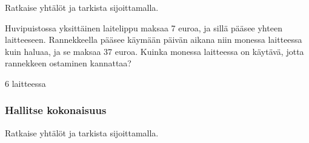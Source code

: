 \begin{tehtavasivu}
\begin{tehtava}
Ratkaise yhtälöt ja tarkista sijoittamalla.
\begin{alakohdat}
\end{alakohdat}
%
\begin{vastaus}
\begin{alakohdat}
\end{alakohdat}
\end{vastaus}
\end{tehtava}

\begin{tehtava}
Huvipuistossa yksittäinen laitelippu maksaa 7 euroa, ja sillä pääsee yhteen laitteeseen. Rannekkeella pääsee käymään päivän aikana niin monessa laitteessa kuin haluaa, ja se maksaa 37 euroa. Kuinka monessa laitteessa on käytävä, jotta rannekkeen ostaminen kannattaa?
\begin{vastaus}
$6$ laitteessa
\end{vastaus}
\end{tehtava}

\subsubsection*{Hallitse kokonaisuus}


\begin{tehtava}
Ratkaise yhtälöt ja tarkista sijoittamalla.
\begin{alakohdat}
\end{alakohdat}
%
\begin{vastaus}
\begin{alakohdat}
\end{alakohdat}
\end{vastaus}
\end{tehtava}



\end{tehtavasivu}
